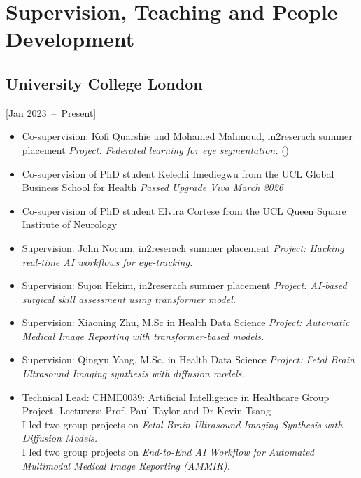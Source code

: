 \documentclass{mycv}
\begin{document}
\section{Supervision, Teaching and People Development}

\subsection{University College London}[Jan 2023~--~Present]
\begin{itemize}

	\item Co-supervision: Kofi Quarshie and Mohamed Mahmoud, in2reserach summer placement
			\textit{Project: Federated learning for eye segmentation.}
			\href{https://blogs.ucl.ac.uk/research-software-development/celebrating-our-in2research-students-at-arc/}{(\faExternalLink*)}

	\item Co-supervision of PhD student Kelechi Imediegwu from the UCL Global Business School for Health
			\textit{Passed Upgrade Viva March 2026}

	\item Co-supervision of PhD student Elvira Cortese from the UCL Queen Square Institute of Neurology

	\item Supervision: John Nocum, in2reserach summer placement
			\textit{Project: Hacking real-time AI workflows for eye-tracking.}

	\item Supervision: Sujon Hekim, in2reserach summer placement
			\textit{Project: AI-based surgical skill assessment using transformer model.}

	\item Supervision: Xiaoning Zhu, M.Sc in Health Data Science
		\textit{Project: Automatic Medical Image Reporting with transformer-based models.}
	\item Supervision: Qingyu Yang, M.Sc. in Health Data Science
		\textit{Project: Fetal Brain Ultrasound Imaging synthesis with diffusion models.}

	\item Technical Lead: CHME0039: Artificial Intelligence in Healthcare Group Project. Lecturers: Prof. Paul Taylor and Dr Kevin Tsang
	\\ I led two group projects on \textit{Fetal Brain Ultrasound Imaging Synthesis with Diffusion Models.} 
	\\ I led two group projects on \textit{End-to-End AI Workflow for Automated Multimodal Medical Image Reporting (AMMIR).} 

\end{itemize}
\end{document}
